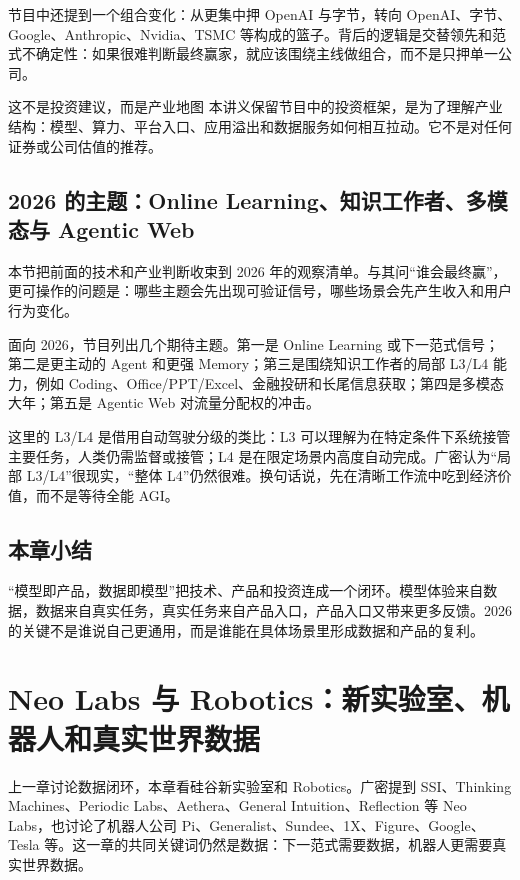 \documentclass[a4paper]{article}
\begin{document}
节目中还提到一个组合变化：从更集中押 OpenAI 与字节，转向 OpenAI、字节、Google、Anthropic、Nvidia、TSMC 等构成的篮子。背后的逻辑是交替领先和范式不确定性：如果很难判断最终赢家，就应该围绕主线做组合，而不是只押单一公司。

\begin{knowledgebox}{这不是投资建议，而是产业地图}
本讲义保留节目中的投资框架，是为了理解产业结构：模型、算力、平台入口、应用溢出和数据服务如何相互拉动。它不是对任何证券或公司估值的推荐。
\end{knowledgebox}

\subsection{2026 的主题：Online Learning、知识工作者、多模态与 Agentic Web}

本节把前面的技术和产业判断收束到 2026 年的观察清单。与其问“谁会最终赢”，更可操作的问题是：哪些主题会先出现可验证信号，哪些场景会先产生收入和用户行为变化。

面向 2026，节目列出几个期待主题。第一是 Online Learning 或下一范式信号；第二是更主动的 Agent 和更强 Memory；第三是围绕知识工作者的局部 L3/L4 能力，例如 Coding、Office/PPT/Excel、金融投研和长尾信息获取；第四是多模态大年；第五是 Agentic Web 对流量分配权的冲击。

这里的 L3/L4 是借用自动驾驶分级的类比：L3 可以理解为在特定条件下系统接管主要任务，人类仍需监督或接管；L4 是在限定场景内高度自动完成。广密认为“局部 L3/L4”很现实，“整体 L4”仍然很难。换句话说，先在清晰工作流中吃到经济价值，而不是等待全能 AGI。

\subsection{本章小结}

“模型即产品，数据即模型”把技术、产品和投资连成一个闭环。模型体验来自数据，数据来自真实任务，真实任务来自产品入口，产品入口又带来更多反馈。2026 的关键不是谁说自己更通用，而是谁能在具体场景里形成数据和产品的复利。

\section{Neo Labs 与 Robotics：新实验室、机器人和真实世界数据}

上一章讨论数据闭环，本章看硅谷新实验室和 Robotics。广密提到 SSI、Thinking Machines、Periodic Labs、Aethera、General Intuition、Reflection 等 Neo Labs，也讨论了机器人公司 Pi、Generalist、Sundee、1X、Figure、Google、Tesla 等。这一章的共同关键词仍然是数据：下一范式需要数据，机器人更需要真实世界数据。
\end{document}
